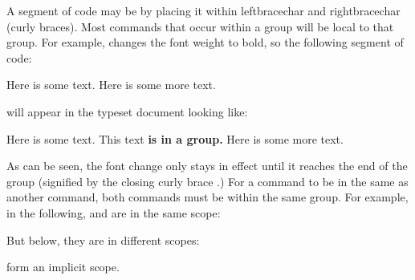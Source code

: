  A segment of code may be  by placing it
 within \gls{leftbracechar} and \gls{rightbracechar} (curly braces).
 Most \glspl{command} that occur within a group will be
 local to that group.  For example,  changes
 the font weight to bold, so the following segment of code:
\begin{code}
Here is some text.  Here is some more text.
\end{code}%
will appear in the typeset document looking like:
\begin{resultS}
Here is some text. {This text \bfseries is in a group.}
Here is some more text.
\end{resultS}

As can be seen, the font change only stays in effect until it
reaches the end of the group (signified by the closing curly brace
.) For a command to be in the same
 as another command, both commands must be within the same group.
For example, in the following,  and
 are in the same scope:
\begin{codeS}
\end{codeS}
But below, they are in different scopes:
\begin{codeS}
\end{codeS}

 form an implicit scope.
